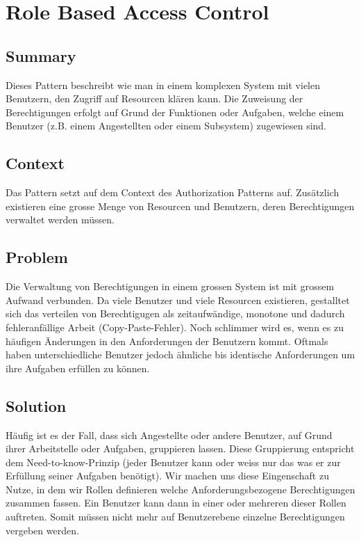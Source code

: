 \chapter{Role Based Access Control}

\section{Summary}
Dieses Pattern beschreibt wie man in einem komplexen System mit vielen Benutzern, den Zugriff auf Resourcen klären kann. Die Zuweisung der Berechtigungen erfolgt auf Grund der Funktionen oder Aufgaben, welche einem Benutzer (z.B. einem Angestellten oder einem Subsystem) zugewiesen sind.

\section{Context}
Das Pattern setzt auf dem Context des Authorization Patterns auf. Zusätzlich existieren eine grosse Menge von Resourcen und Benutzern, deren Berechtigungen verwaltet werden müssen.

\section{Problem}
Die Verwaltung von Berechtigungen in einem grossen System ist mit grossem Aufwand verbunden. Da viele Benutzer und viele Resourcen existieren, gestalltet sich das verteilen von Berechtigugen als zeitaufwändige, monotone und dadurch fehleranfällige Arbeit (Copy-Paste-Fehler). Noch schlimmer wird es, wenn es zu häufigen Änderungen in den Anforderungen der Benutzern kommt. Oftmals haben unterschiedliche Benutzer jedoch ähnliche bis identische Anforderungen um ihre Aufgaben erfüllen zu können.

\section{Solution}
Häufig ist es der Fall, dass sich Angestellte oder andere Benutzer, auf Grund ihrer Arbeitstelle oder Aufgaben, gruppieren lassen. Diese Gruppierung entspricht dem Need-to-know-Prinzip (jeder Benutzer kann oder weiss nur das was er zur Erfüllung seiner Aufgaben benötigt). Wir machen uns diese Eingenschaft zu Nutze, in dem wir Rollen definieren welche Anforderungsbezogene Berechtigungen zusammen fassen. Ein Benutzer kann dann in einer oder mehreren dieser Rollen auftreten. Somit müssen nicht mehr auf Benutzerebene einzelne Berechtigungen vergeben werden.

